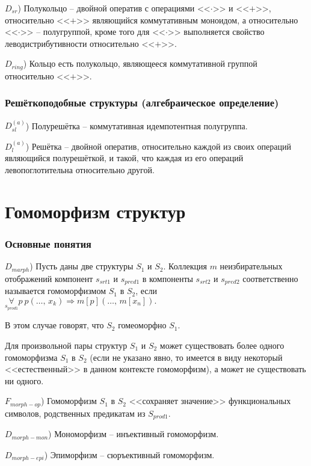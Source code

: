 \documentclass[a4paper]{article}
\begin{document}
$D_{sr}$) Полукольцо -- двойной оператив с операциями <<$\cdot$>> и <<$+$>>, относительно <<$+$>> являющийся коммутативным моноидом, а относительно <<$\cdot$>> -- полугруппой, кроме того для <<$\cdot$>> выполняется свойство леводистрибутивности относительно <<$+$>>.

$D_{ring}$) Кольцо есть полукольцо, являющееся коммутативной группой относительно <<$+$>>.

\section{Решёткоподобные структуры (алгебраическое определение)}

$D_{sl}^{(a)}$) Полурешётка -- коммутативная идемпотентная полугруппа.

$D_{l}^{(a)}$) Решётка -- двойной оператив, относительно каждой из своих операций являющийся полурешёткой, и такой, что каждая из его операций левопоглотительна относительно другой.

\clearpage


\part{Гомоморфизм структур}

\section{Основные понятия}

$D_{marph}$) Пусть даны две структуры $S_1$ и $S_2$. Коллекция $m$ неизбирательных отображений компонент $s_{srt1}$ и $s_{pred1}$ в компоненты $s_{srt2}$ и $s_{pred2}$ соответственно называется гомоморфизмом $S_1$ в $S_2$, если $\underset{s_{prod1}}{\forall} p~p(\dots, \, x_k) \Rightarrow m[p] (\dots, \, m[x_n]).$

В этом случае говорят, что $S_2$ гомеоморфно $S_1$.

Для произвольной пары структур $S_1$ и $S_2$ может существовать более одного гомоморфизма $S_1$ в $S_2$ (если не указано явно, то имеется в виду некоторый <<естественный>> в данном контексте гомоморфизм), а может не существовать ни одного.

$F_{morph-op}$) Гомоморфизм $S_1$ в $S_2$ <<сохраняет значение>> функциональных символов, родственных предикатам из $S_{prod1}$.

$D_{morph-mon}$) Мономорфизм -- инъективный гомоморфизм.

$D_{morph-epi}$) Эпиморфизм -- сюръективный гомоморфизм.
\end{document}
